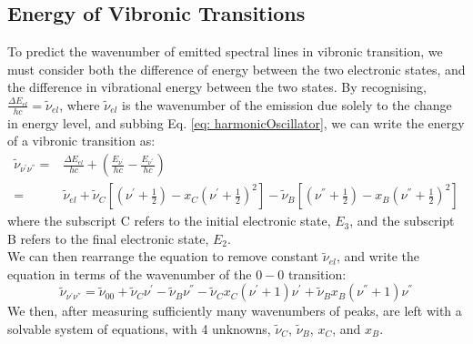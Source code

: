 \documentclass{article}
\begin{document}
\subsection{Energy of Vibronic Transitions}
To predict the wavenumber of emitted spectral lines in vibronic transition, we must consider both the difference of energy between the two electronic states, and the difference in vibrational energy between the two states. By recognising, $\frac{\Delta E_{el}}{hc} = \tilde{\nu}_{el}$, where $\tilde{\nu}_{el}$ is the wavenumber of the emission due solely to the change in energy level, and subbing Eq. \ref{eq: harmonicOscillator}, we can write the energy of a vibronic transition as:
\begin{align}
    \tilde{\nu}_{\nu^{\prime}\nu^{''}} =& \frac{\Delta E_{el}}{hc}+\left(\frac{E_{\nu^{\prime}}}{hc}-\frac{E_{\nu^{''}}}{hc}\right)\\
    =& \tilde{\nu}_{el} + \tilde{\nu}_C\left[\left(\nu^{\prime}+\frac{1}{2}\right)-x_C\left(\nu^{\prime}+\frac{1}{2}\right)^2\right]-\tilde{\nu}_B\left[\left(\nu^{''}+\frac{1}{2}\right)-x_B\left(\nu^{''}+\frac{1}{2}\right)^2\right]
\end{align}
where the subscript C refers to the initial electronic state, $E_3$, and the subscript B refers to the final electronic state, $E_2$.\\
\indent We can then rearrange the equation to remove constant $\tilde{\nu}_{el}$, and write the equation in terms of the wavenumber of the $0-0$ transition:
\begin{equation}
    \label{eq: vibronicTransitionwavenumber}
    \tilde{\nu}_{\nu^{\prime}\nu^{''}} = \tilde{\nu}_{00} + \tilde{\nu}_C\nu^{\prime} - \tilde{\nu}_B\nu^{''} - \tilde{\nu}_Cx_C(\nu^{\prime}+1)\nu^{\prime} + \tilde{\nu}_Bx_B(\nu^{''}+1)\nu^{''}
\end{equation}
\indent We then, after measuring sufficiently many wavenumbers of peaks, are left with a solvable system of equations, with 4 unknowns, $\tilde{\nu}_C$, $\tilde{\nu}_B$, $x_C$, and $x_B$.
\end{document}
